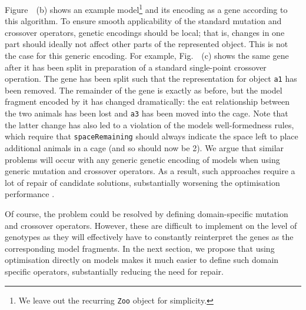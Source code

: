 	
	Figure~~(b) shows an example model\footnote{We leave out the recurring \texttt{Zoo} object for simplicity.} and its encoding as a gene according to this algorithm. To ensure
	smooth applicability of the standard mutation and crossover operators, genetic encodings should be local; that is, changes in one part should ideally not affect other parts of the represented
	object. This is not the case for this generic encoding. For example, Fig.~~(c) shows the same gene after it has been split in preparation of a standard single-point crossover
	operation. The gene has been split such that the representation for object \texttt{a1} has been removed. The remainder of the gene is exactly as before, but the model fragment encoded by it has
	changed dramatically: the eat relationship between the two animals has been lost and \texttt{a3} has been moved into the cage. Note that the latter change has also led to a violation of the models
	well-formedness rules, which require that \texttt{spaceRemaining} should always indicate the space left to place additional animals in a cage (and so should now be 2). We argue that similar problems
	will occur with any generic genetic encoding of models when using generic mutation and crossover operators. As a result, such approaches require a lot of repair of candidate solutions, substantially
	worsening the optimisation performance \cite{Efstathiou+14b}.
	
	Of course, the problem could be resolved by defining domain-specific mutation and crossover operators. However, these are difficult to implement on the level of genotypes as they will effectively
	have to constantly reinterpret the genes as the corresponding model fragments. In the next section, we propose that using optimisation directly on models makes it much easier to define such domain
	specific operators, substantially reducing the need for repair.